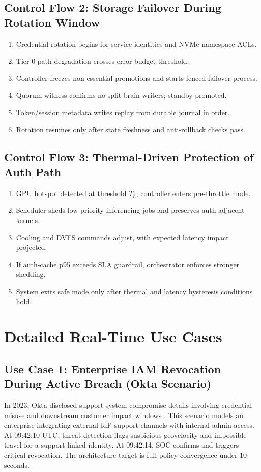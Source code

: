 \documentclass[12pt]{article}
\begin{document}
\subsection{Control Flow 2: Storage Failover During Rotation Window}
\begin{enumerate}
  \item Credential rotation begins for service identities and NVMe namespace ACLs.
  \item Tier-0 path degradation crosses error budget threshold.
  \item Controller freezes non-essential promotions and starts fenced failover process.
  \item Quorum witness confirms no split-brain writers; standby promoted.
  \item Token/session metadata writes replay from durable journal in order.
  \item Rotation resumes only after state freshness and anti-rollback checks pass.
\end{enumerate}

\subsection{Control Flow 3: Thermal-Driven Protection of Auth Path}
\begin{enumerate}
  \item GPU hotspot detected at threshold $T_h$; controller enters pre-throttle mode.
  \item Scheduler sheds low-priority inferencing jobs and preserves auth-adjacent kernels.
  \item Cooling and DVFS commands adjust, with expected latency impact projected.
  \item If auth-cache p95 exceeds SLA guardrail, orchestrator enforces stronger shedding.
  \item System exits safe mode only after thermal and latency hysteresis conditions hold.
\end{enumerate}

\section{Detailed Real-Time Use Cases}
\subsection{Use Case 1: Enterprise IAM Revocation During Active Breach (Okta Scenario)}
In 2023, Okta disclosed support-system compromise details involving credential misuse and downstream customer impact windows \cite{okta-incident-2023,okta-postmortem-update}. This scenario models an enterprise integrating external IdP support channels with internal admin access. At 09:42:10 UTC, threat detection flags suspicious geovelocity and impossible travel for a support-linked identity. At 09:42:14, SOC confirms and triggers critical revocation. The architecture target is full policy convergence under 10 seconds.
\end{document}
